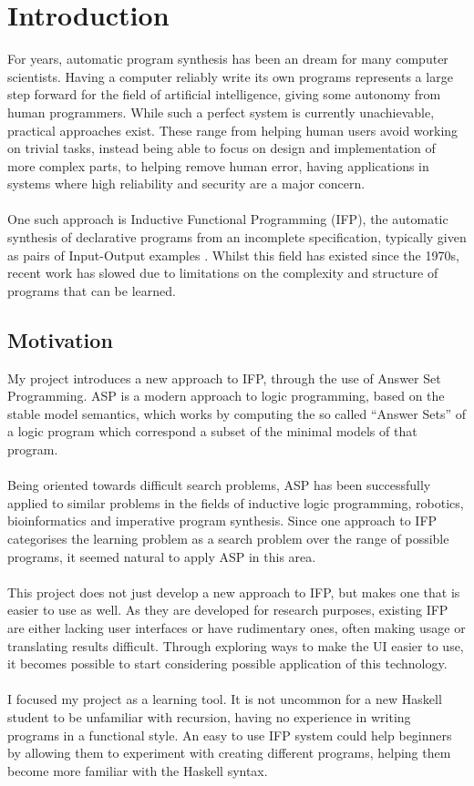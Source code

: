 \chapter{Introduction}
For years, automatic program synthesis has been an dream for many computer scientists. Having a computer reliably write its own programs represents a large step forward for the field of artificial intelligence, giving some autonomy from human programmers. While such a perfect system is currently unachievable, practical approaches exist. These range from helping human users avoid working on trivial tasks, instead being able to focus on design and implementation of more complex parts, to helping remove human error, having applications in systems where high reliability and security are a major concern. \\ \\ 
One such approach is Inductive Functional Programming (IFP), the automatic synthesis of declarative programs from an incomplete specification, typically given as pairs of Input-Output examples \cite{IFPnotes}. Whilst this field has existed since the 1970s, recent work has slowed due to limitations on the complexity and structure of programs that can be learned. 

\section{Motivation}

My project introduces a new approach to IFP, through the use of Answer Set Programming. ASP is a modern approach to logic programming, based on the stable model semantics, which works by computing the so called ``Answer Sets'' of a logic program which correspond a subset of the minimal models of that program. \\ \\
Being oriented towards difficult search problems, ASP has been successfully applied to similar problems in the fields of inductive logic programming, robotics, bioinformatics and imperative program synthesis. Since one approach to IFP categorises the learning problem as a search problem over the range of possible programs, it seemed natural to apply ASP in this area. \\ \\
This project does not just develop a new approach to IFP, but makes one that is easier to use as well. As they are developed for research purposes, existing IFP are either lacking user interfaces or have rudimentary ones, often making usage or translating results difficult. Through exploring ways to make the UI easier to use, it becomes possible to start considering possible application of this technology. \\ \\
I focused my project as a learning tool. It is not uncommon for a new Haskell student to be unfamiliar with recursion, having no experience in writing programs in a functional style. An easy to use IFP system could help beginners by allowing them to experiment with creating different programs, helping them become more familiar with the Haskell syntax.


